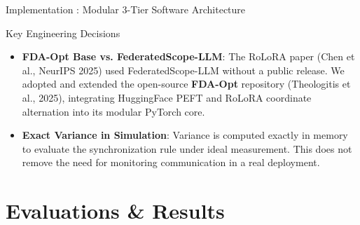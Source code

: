 \documentclass[aspectratio=169]{beamer}
\begin{document}
\begin{frame}{Implementation : Modular 3-Tier Software Architecture}
    \vspace{0.3em}
    \begin{block}{Key Engineering Decisions}
        \footnotesize
        \begin{itemize}
            \item \textbf{FDA-Opt Base vs. FederatedScope-LLM}: The RoLoRA paper (Chen et al., NeurIPS 2025) used FederatedScope-LLM without a public release. We adopted and extended the open-source \textbf{FDA-Opt} repository (Theologitis et al., 2025), integrating HuggingFace PEFT and RoLoRA coordinate alternation into its modular PyTorch core.
            \item \textbf{Exact Variance in Simulation}: Variance is computed exactly in memory to evaluate the synchronization rule under ideal measurement. This does not remove the need for monitoring communication in a real deployment.
        \end{itemize}
    \end{block}
\end{frame}





\section{Evaluations \& Results}
\end{document}

